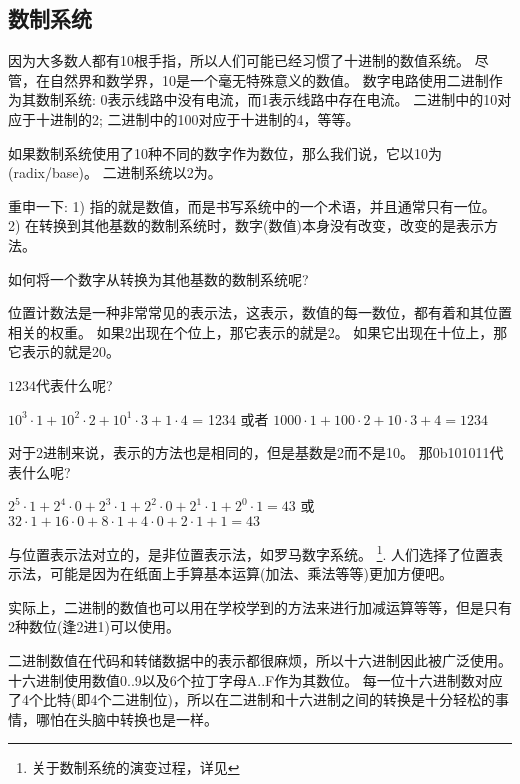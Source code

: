 \subsection{数制系统}

因为大多数人都有10根手指，所以人们可能已经习惯了十进制的数值系统。
尽管，在自然界和数学界，10是一个毫无特殊意义的数值。
数字电路使用二进制作为其数制系统: 0表示线路中没有电流，而1表示线路中存在电流。
二进制中的10对应于十进制的2; 二进制中的100对应于十进制的4，等等。

如果数制系统使用了10种不同的数字作为数位，那么我们说，它以10为(radix/base)。
二进制系统以2为。

重申一下:
1) 指的就是数值，而是书写系统中的一个术语，并且通常只有一位。
2) 在转换到其他基数的数制系统时，数字(数值)本身没有改变，改变的是表示方法。

如何将一个数字从转换为其他基数的数制系统呢?

位置计数法是一种非常常见的表示法，这表示，数值的每一数位，都有着和其位置相关的权重。
如果2出现在个位上，那它表示的就是2。
如果它出现在十位上，那它表示的就是20。

$1234$代表什么呢?

$10^3 \cdot 1 + 10^2 \cdot 2 + 10^1 \cdot 3 + 1 \cdot 4$ = 1234 或者
$1000 \cdot 1 + 100 \cdot 2 + 10 \cdot 3 + 4 = 1234$

对于2进制来说，表示的方法也是相同的，但是基数是2而不是10。
那0b101011代表什么呢?

$2^5 \cdot 1 + 2^4 \cdot 0 + 2^3 \cdot 1 + 2^2 \cdot 0 + 2^1 \cdot 1 + 2^0 \cdot 1 = 43$ 或
$32 \cdot 1 + 16 \cdot 0 + 8 \cdot 1 + 4 \cdot 0 + 2 \cdot 1 + 1 = 43$

与位置表示法对立的，是非位置表示法，如罗马数字系统。
\footnote{关于数制系统的演变过程，详见}.
人们选择了位置表示法，可能是因为在纸面上手算基本运算(加法、乘法等等)更加方便吧。

实际上，二进制的数值也可以用在学校学到的方法来进行加减运算等等，但是只有2种数位(逢2进1)可以使用。

二进制数值在代码和转储数据中的表示都很麻烦，所以十六进制因此被广泛使用。
十六进制使用数值0..9以及6个拉丁字母A..F作为其数位。
每一位十六进制数对应了4个比特(即4个二进制位)，所以在二进制和十六进制之间的转换是十分轻松的事情，哪怕在头脑中转换也是一样。

